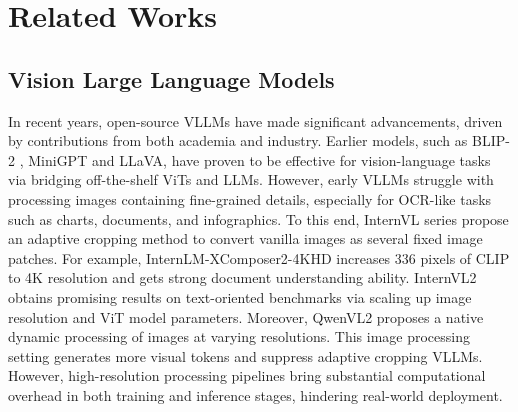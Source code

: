 \section{Related Works}
\subsection{Vision Large Language Models}



In recent years, open-source  VLLMs have made significant advancements, driven by contributions from both academia and industry. 
Earlier models, such as BLIP-2 \cite{li2023blip}, MiniGPT\cite{zhu2023minigpt} and LLaVA\cite{liu2024visual,liu2024llava}, have proven to be effective for vision-language tasks via bridging off-the-shelf ViTs and LLMs. 
However, early VLLMs struggle with processing images containing
fine-grained details, especially for OCR-like tasks such as charts\cite{masry2022chartqa}, documents\cite{mathew2021docvqa},
and infographics\cite{mathew2022infographicvqa}. To this end, InternVL series propose
an adaptive cropping method to convert vanilla images as several fixed image patches. For example, InternLM-XComposer2-4KHD\cite{dong2024internlm} increases 336 pixels of CLIP to 4K resolution and gets strong document understanding ability. InternVL2
obtains promising results on text-oriented benchmarks via scaling up image resolution and ViT model parameters. Moreover, QwenVL2 \cite{wang2024qwen2vl} proposes a native dynamic processing of images at varying resolutions. This image processing setting generates more visual tokens and suppress adaptive cropping VLLMs. However,
high-resolution processing pipelines bring substantial computational overhead in both training and inference stages, hindering real-world deployment.






